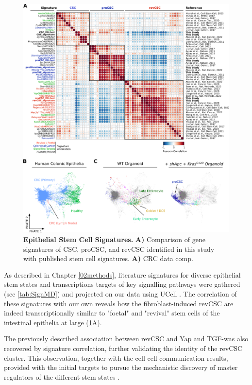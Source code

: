 \begin{figure}
    \centering
    \includegraphics{04seq/figs/4SEQ_StemSign.png}
    \caption{\textbf{Epithelial Stem Cell Signatures.} \textbf{A)} Comparison of gene signatures of CSC, proCSC, and revCSC identified in this study with published stem cell signatures. \textbf{A)} CRC data comp.}
    \label{fig:4sign}
\end{figure}

As described in Chapter \ref{02methods}, literature signatures for diverse epithelial stem states and transcriptions targets of key signalling pathways were gathered (see \ref{tab:SignMD}) and projected on our data using UCell \cite{andreatta_ucell_2021}. The correlation of these signatures with our own reveals how the fibroblast-induced revCSC are indeed transcriptionally similar to "foetal" \cite{mustata_identification_2013, yui_yaptaz-dependent_2018} and "revival" stem cells \cite{ayyaz_single-cell_2019} of the intestinal epithelia at large (\ref{fig:4sign}A). 

The previously described association between revCSC and Yap and TGF-\textbeta\hspace{0.1cm}was also recovered by signature correlation, further validating the identity of the revCSC cluster. This observation, together with the cell-cell communication results, provided with the initial targets to pursue the mechanistic discovery of master regulators of the different stem states \cite{cardoso_rodriguez_single-cell_2023}.

